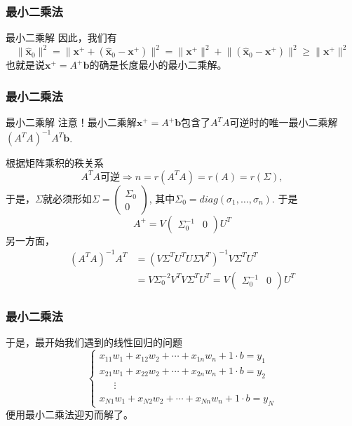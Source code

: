 
\begin{frame}
\frametitle{最小二乘法}

\begin{block}{最小二乘解}
因此，我们有
\[\lVert \widehat{\mathbf{x}}_0 \rVert^2 = \lVert \mathbf{x}^+ + (\widehat{\mathbf{x}}_0 - \mathbf{x}^+) \rVert^2 = \lVert \mathbf{x}^+ \rVert^2 + \lVert (\widehat{\mathbf{x}}_0 - \mathbf{x}^+) \rVert^2 \geqslant \lVert \mathbf{x}^+ \rVert^2\]
也就是说$\mathbf{x}^+ = A^+\mathbf{b}$的确是长度最小的最小二乘解。
\end{block}

\end{frame}


\begin{frame}
\frametitle{最小二乘法}

\begin{block}{最小二乘解}
{\color{red}注意}！最小二乘解$\mathbf{x}^+ = A^+\mathbf{b}$包含了$A^TA$可逆时的唯一最小二乘解$(A^TA)^{-1}A^T\mathbf{b}$.

\vspace{1em}
\pause

根据矩阵乘积的秩关系
\[A^TA\text{可逆} \Longrightarrow n = r(A^TA) = r(A) = r(\Sigma),\]
于是，$\Sigma$就必须形如$\Sigma = \begin{pmatrix} \Sigma_0 \\ 0 \end{pmatrix}$, 其中$\Sigma_0 = diag(\sigma_1, \ldots, \sigma_n)$. 于是
\[A^+ = V\begin{pmatrix} \Sigma_0^{-1} & 0 \end{pmatrix} U^T\]
另一方面，
\begin{align*}
(A^TA)^{-1}A^T & = (V\Sigma^TU^TU\Sigma V^T)^{-1} V\Sigma^TU^T \\
& = V \Sigma_0^{-2} V^T V\Sigma^TU^T = V\begin{pmatrix} \Sigma_0^{-1} & 0 \end{pmatrix} U^T
\end{align*}
\end{block}

\end{frame}


\begin{frame}
\frametitle{最小二乘法}

于是，最开始我们遇到的线性回归的问题
\[
\begin{cases}
x_{11}w_1 + x_{12}w_2 + \cdots + x_{1n}w_n + 1\cdot b = y_1 \\
x_{21}w_1 + x_{22}w_2 + \cdots + x_{2n}w_n + 1\cdot b = y_2 \\
\phantom{yyy} \vdots \\
x_{N1}w_1 + x_{N2}w_2 + \cdots + x_{Nn}w_n + 1\cdot b = y_N
\end{cases}\]
便用最小二乘法迎刃而解了。

\end{frame}


